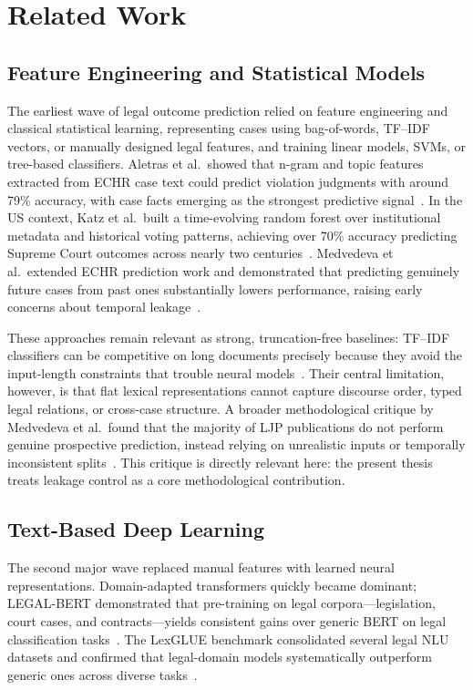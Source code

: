\chapter{Related Work}

\section{Feature Engineering and Statistical Models}

The earliest wave of legal outcome prediction relied on feature engineering and classical statistical learning, representing cases using bag-of-words, TF--IDF vectors, or manually designed legal features, and training linear models, SVMs, or tree-based classifiers. Aletras et al.\ showed that n-gram and topic features extracted from ECHR case text could predict violation judgments with around 79\% accuracy, with case facts emerging as the strongest predictive signal~\cite{aletras2016echr}. In the US context, Katz et al.\ built a time-evolving random forest over institutional metadata and historical voting patterns, achieving over 70\% accuracy predicting Supreme Court outcomes across nearly two centuries~\cite{katz2017supreme}. Medvedeva et al.\ extended ECHR prediction work and demonstrated that predicting genuinely future cases from past ones substantially lowers performance, raising early concerns about temporal leakage~\cite{medvedeva2020echr}.

These approaches remain relevant as strong, truncation-free baselines: TF--IDF classifiers can be competitive on long documents precisely because they avoid the input-length constraints that trouble neural models~\cite{mamakas2022longlegal}. Their central limitation, however, is that flat lexical representations cannot capture discourse order, typed legal relations, or cross-case structure. A broader methodological critique by Medvedeva et al.\ found that the majority of LJP publications do not perform genuine prospective prediction, instead relying on unrealistic inputs or temporally inconsistent splits~\cite{medvedeva2023doitright}. This critique is directly relevant here: the present thesis treats leakage control as a core methodological contribution.

\section{Text-Based Deep Learning}

The second major wave replaced manual features with learned neural representations. Domain-adapted transformers quickly became dominant; LEGAL-BERT demonstrated that pre-training on legal corpora---legislation, court cases, and contracts---yields consistent gains over generic BERT on legal classification tasks~\cite{chalkidis2020legalbert}. The LexGLUE benchmark consolidated several legal NLU datasets and confirmed that legal-domain models systematically outperform generic ones across diverse tasks~\cite{chalkidis2022lexglue}.

